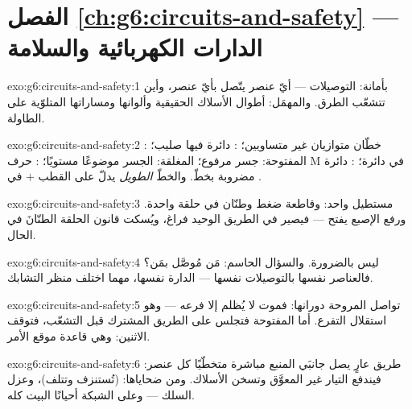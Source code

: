 \section*{الفصل \ref{ch:g6:circuits-and-safety} --- الدارات الكهربائية والسلامة}

\begin{solution}{exo:g6:circuits-and-safety:1}
بأمانة: التوصيلات --- أيّ عنصر يتّصل بأيّ عنصر، وأين تتشعّب
الطرق. والمهمَل: أطوال الأسلاك الحقيقية وألوانها ومساراتها
المتلوّية على الطاولة.
\end{solution}

\begin{solution}{exo:g6:circuits-and-safety:2}
: خطّان متوازيان غير متساويين؛ : دائرة فيها
صليب؛  المفتوحة: جسر مرفوع؛  المغلقة: الجسر
موضوعًا مستويًا؛ : حرف M في دائرة؛ : دائرة
مضروبة بخطّ. والخطّ \emph{الطويل} يدلّ على القطب $+$ في
.
\end{solution}

\begin{solution}{exo:g6:circuits-and-safety:3}
مستطيل واحد:  وقاطعة ضغط وطنّان في حلقة واحدة. ورفع
الإصبع يفتح  --- فيصير في الطريق الوحيد فراغ، ويُسكت
قانون الحلقة الطنّانَ في الحال.
\end{solution}

\begin{solution}{exo:g6:circuits-and-safety:4}
ليس بالضرورة. والسؤال الحاسم: مَن مُوصَّل بمَن؟ فالعناصر نفسها
بالتوصيلات نفسها --- الدارة نفسها، مهما اختلف منظر التشابك.
\end{solution}

\begin{solution}{exo:g6:circuits-and-safety:5}
تواصل المروحة دورانها: فموت  لا يُظلم إلا فرعه --- وهو
استقلال التفرع. أما  المفتوحة فتجلس على الطريق المشترك
قبل التشعّب، فتوقف الاثنين: وهي قاعدة موقع الأمر.
\end{solution}

\begin{solution}{exo:g6:circuits-and-safety:6}
طريق  عارٍ يصل جانبَي المنبع مباشرة متخطّيًا كل عنصر:
فيندفع التيار غير المعوَّق وتسخن الأسلاك. ومن ضحاياها: 
(تُستنزف وتتلف)، وعزل السلك --- وعلى الشبكة أحيانًا البيت
كله.
\end{solution}

